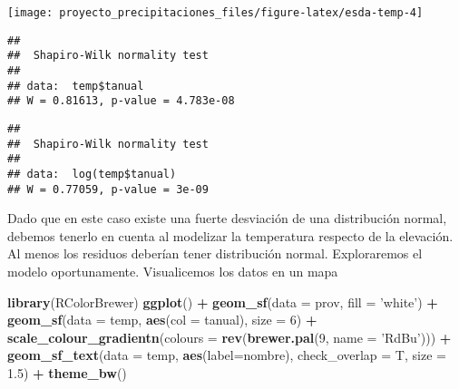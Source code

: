 \documentclass[11pt,]{article}
\newenvironment{Shaded}{\begin{snugshade}}{\end{snugshade}}
\newcommand{\KeywordTok}[1]{\textcolor[rgb]{0.13,0.29,0.53}{\textbf{#1}}}
\newcommand{\DataTypeTok}[1]{\textcolor[rgb]{0.13,0.29,0.53}{#1}}
\newcommand{\DecValTok}[1]{\textcolor[rgb]{0.00,0.00,0.81}{#1}}
\newcommand{\FloatTok}[1]{\textcolor[rgb]{0.00,0.00,0.81}{#1}}
\newcommand{\StringTok}[1]{\textcolor[rgb]{0.31,0.60,0.02}{#1}}
\newcommand{\OperatorTok}[1]{\textcolor[rgb]{0.81,0.36,0.00}{\textbf{#1}}}
\newcommand{\NormalTok}[1]{#1}
\begin{document}
\begin{Shaded}
\end{Shaded}

\texttt{[image: proyecto\_precipitaciones\_files/figure-latex/esda-temp-4]}

\begin{Shaded}
\end{Shaded}

\begin{verbatim}
## 
##  Shapiro-Wilk normality test
## 
## data:  temp$tanual
## W = 0.81613, p-value = 4.783e-08
\end{verbatim}

\begin{Shaded}
\end{Shaded}

\begin{verbatim}
## 
##  Shapiro-Wilk normality test
## 
## data:  log(temp$tanual)
## W = 0.77059, p-value = 3e-09
\end{verbatim}

Dado que en este caso existe una fuerte desviación de una distribución
normal, debemos tenerlo en cuenta al modelizar la temperatura respecto
de la elevación. Al menos los residuos deberían tener distribución
normal. Exploraremos el modelo oportunamente. Visualicemos los datos en
un mapa

\begin{Shaded}
\begin{Highlighting}[]
\KeywordTok{library}\NormalTok{(RColorBrewer)}
\KeywordTok{ggplot}\NormalTok{() }\OperatorTok{+}
\StringTok{  }\KeywordTok{geom_sf}\NormalTok{(}\DataTypeTok{data =}\NormalTok{ prov, }\DataTypeTok{fill =} \StringTok{'white'}\NormalTok{) }\OperatorTok{+}
\StringTok{  }\KeywordTok{geom_sf}\NormalTok{(}\DataTypeTok{data =}\NormalTok{ temp, }\KeywordTok{aes}\NormalTok{(}\DataTypeTok{col =}\NormalTok{ tanual), }\DataTypeTok{size =} \DecValTok{6}\NormalTok{) }\OperatorTok{+}\StringTok{ }
\StringTok{  }\KeywordTok{scale_colour_gradientn}\NormalTok{(}\DataTypeTok{colours =} \KeywordTok{rev}\NormalTok{(}\KeywordTok{brewer.pal}\NormalTok{(}\DecValTok{9}\NormalTok{, }\DataTypeTok{name =} \StringTok{'RdBu'}\NormalTok{))) }\OperatorTok{+}
\StringTok{  }\KeywordTok{geom_sf_text}\NormalTok{(}\DataTypeTok{data =}\NormalTok{ temp, }\KeywordTok{aes}\NormalTok{(}\DataTypeTok{label=}\NormalTok{nombre), }\DataTypeTok{check_overlap =}\NormalTok{ T, }\DataTypeTok{size =} \FloatTok{1.5}\NormalTok{) }\OperatorTok{+}
\StringTok{  }\KeywordTok{theme_bw}\NormalTok{()}
\end{Highlighting}
\end{Shaded}
\end{document}
